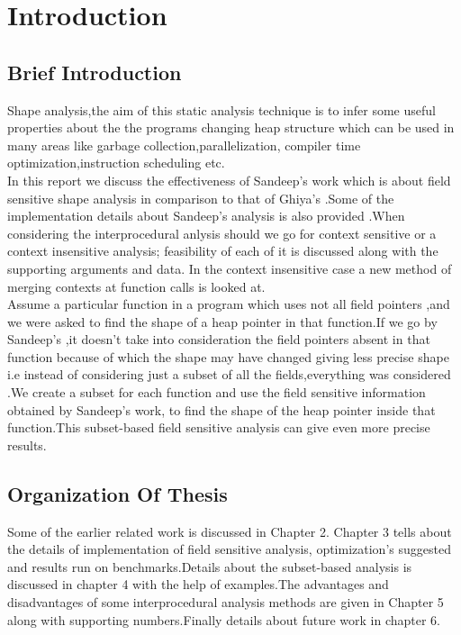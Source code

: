 \documentclass[11pt]{article}
\begin{document}
 
\section{Introduction}
\subsection{Brief Introduction}

Shape analysis,the aim of this static analysis technique is to infer some useful properties about the
the programs changing heap structure  which can be used in many areas like garbage collection,parallelization,
compiler time optimization,instruction scheduling etc. \\
  
  In this report we discuss the effectiveness of Sandeep's \cite{Sandeep} work which is about field sensitive shape analysis
in comparison to that of Ghiya's \cite{Ghiya96}.Some of the  implementation details about Sandeep's \cite{Sandeep} analysis
 is also provided .When considering the interprocedural anlysis should we go  for context sensitive or a context
insensitive analysis; feasibility of each of it is discussed along with the supporting arguments and data.
In the context insensitive case a new method of merging contexts at function calls is looked at.\\

  Assume a particular function in a program which uses not all field pointers ,and we were asked
to find the shape of a heap pointer in that function.If we go by Sandeep's\cite{Sandeep} ,it doesn't take into consideration
the field pointers absent in that function because of which the shape may have changed giving less
precise shape i.e instead of considering just a subset of all the fields,everything was considered .We create a subset
for each function and  use the field sensitive information obtained by Sandeep's \cite{Sandeep} work,
to find the shape of the heap pointer inside that function.This subset-based field sensitive
analysis can give even more precise results.
  
\subsection{Organization Of Thesis}
  Some of the earlier related work is discussed in Chapter 2. Chapter 3
tells about the details of implementation of field sensitive analysis, optimization's suggested and results
run on benchmarks.Details about the subset-based analysis is discussed in chapter 4 with the help of examples.The advantages and disadvantages of
some interprocedural analysis methods are given in Chapter 5 along with supporting numbers.Finally details about 
future work in chapter 6.
\end{document}

